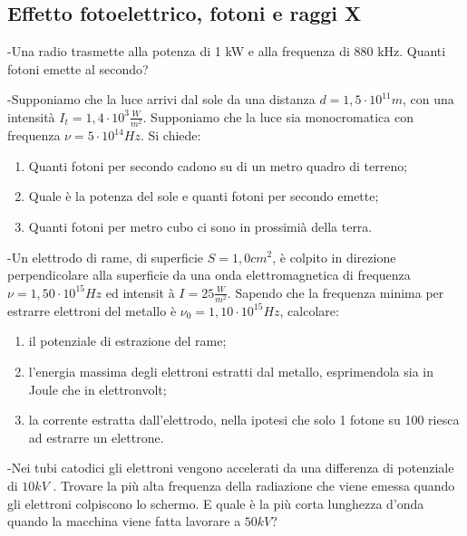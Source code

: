 \documentclass[12pt,twoside,a4]{article}
\begin{document}
\newpage
\subsection{Effetto fotoelettrico, fotoni e raggi X}
\begin{esercizio}
	-Una radio trasmette alla potenza di 1 kW e alla frequenza di 880 kHz. Quanti fotoni emette al secondo?
\end{esercizio}

\begin{esercizio}
	-Supponiamo che la luce arrivi dal sole da una distanza $d=1,5 \cdot 10^{11} m$, con una intensità  $I_t=1,4 \cdot 10^3 \frac{W}{m^2}$. Supponiamo che la luce sia monocromatica con frequenza $\nu =5 \cdot 10^{14} Hz$. Si chiede:
	\begin{enumerate}[label=(\textit{\roman*})]
		\item Quanti fotoni per secondo cadono su di un metro quadro di terreno;
		\item Quale  è la potenza del sole e quanti fotoni per secondo emette;
		\item Quanti fotoni per metro cubo ci sono in prossimià della terra.
	\end{enumerate}
\end{esercizio}

\begin{esercizio}
	-Un elettrodo di rame, di superficie $S=1,0 cm^2$,  è colpito in direzione
perpendicolare alla superficie da una onda elettromagnetica di frequenza $\nu = 1,50 \cdot 10^{15} Hz$ ed intensit à  $I=25\frac{W}{m^2}$. Sapendo che la frequenza minima per estrarre elettroni del metallo  è $\nu_0= 1,10 \cdot 10^{15}Hz$, calcolare:
\begin{enumerate}[label=(\textit{\roman*})]
	\item il potenziale di estrazione del rame;
	\item l'energia massima degli elettroni estratti dal metallo, esprimendola sia in Joule che in elettronvolt;
	\item la corrente estratta dall'elettrodo, nella ipotesi che solo 1 fotone su 100 riesca ad estrarre un elettrone.
\end{enumerate}
\end{esercizio}

\newpage
\begin{esercizio}
	-Nei tubi catodici gli elettroni vengono accelerati da una differenza di potenziale di $10 kV$ . Trovare la più  alta frequenza della radiazione che viene emessa quando gli elettroni colpiscono lo schermo. E quale è la più corta lunghezza d'onda quando la macchina viene fatta lavorare a $50 kV$?
\end{esercizio}
\end{document}
